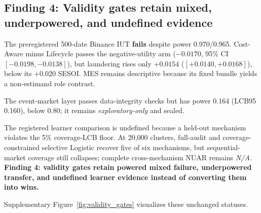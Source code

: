 \subsection{Finding 4: Validity gates retain mixed, underpowered, and undefined evidence}
The preregistered 500-date Binance IUT \textbf{fails} despite power 0.970/0.965. Cost-Aware minus Lifecycle passes the negative-utility arm ($-0.0170$, 95\% CI $[-0.0198,-0.0138]$), but laundering rises only $+0.0154$ ($[+0.0140,+0.0168]$), below its $+0.020$ SESOI. MES remains descriptive because its fixed bundle yields a non-estimand role contrast.

The event-market layer passes data-integrity checks but has power 0.164 (LCB95 0.160), below 0.80; it remains \emph{exploratory-only} and sealed.

The registered learner comparison is undefined because a held-out mechanism violates the 5\% coverage-LCB floor. At 20,000 clusters, full-audit and coverage-constrained selective Logistic recover five of six mechanisms, but sequential-market coverage still collapses; complete cross-mechanism NUAR remains \textit{N/A}. \textbf{Finding 4: validity gates retain powered mixed failure, underpowered transfer, and undefined learner evidence instead of converting them into wins.}

Supplementary Figure~\ref{fig:validity_gates} visualizes these unchanged statuses.
